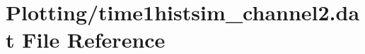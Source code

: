 \hypertarget{Plotting_2time1histsim__channel2_8dat}{}\section{Plotting/time1histsim\+\_\+channel2.dat File Reference}
\label{Plotting_2time1histsim__channel2_8dat}
